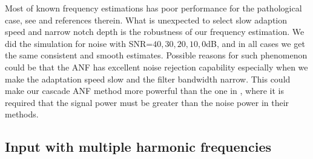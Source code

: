 \documentclass{UCF_ETD}
\begin{document}
Most of known  frequency estimations has poor performance for the
 pathological case, see \cite{Shahram05} and references therein.
 What is unexpected to select slow adaption speed
and narrow notch depth is the robustness of
our frequency estimation.
 We  did the simulation for noise with SNR=$40, 30, 20, 10, 0$dB, and in all cases we get the same consistent and smooth estimates.
Possible reasons for such phenomenon
 could be that the ANF has excellent noise rejection capability especially when we make the adaptation speed  slow  and the filter bandwidth narrow. This could make our cascade ANF method more powerful than the one in
\cite{zhangbrown06},
where it is required that
 the signal power must be greater than the noise power in their methods.


\subsection{Input with multiple harmonic frequencies}
\label{harmonic.subsection}
\end{document}
